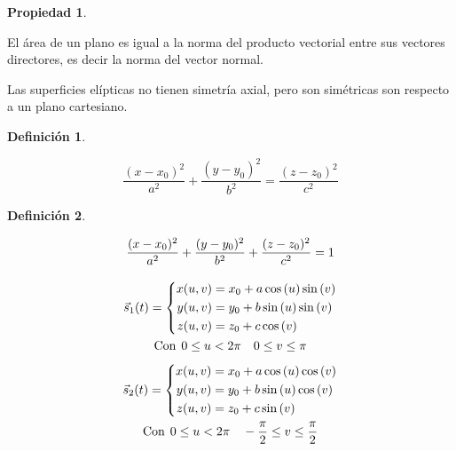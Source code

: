 \documentclass[a5paper,12pt,twoside]{book}
\newtheorem{defn}{{Definición}}[chapter]
\newtheorem{prop}{{Propiedad}}[chapter]
\begin{document}
\begin{mdframed}[style=MyFrame1]
    \begin{prop}
    \end{prop}
    El área de un plano es igual a la norma del producto vectorial entre sus vectores directores, es decir la norma del vector normal.
\end{mdframed}


Las superficies elípticas no tienen simetría axial, pero son simétricas son respecto a un plano cartesiano.

\begin{mdframed}[style=MyFrame1]
    \begin{defn}
    \end{defn}
    \begin{equation*}
        \frac{(x-x_0)^2}{a^2} + \frac{(y-y_0)^2}{b^2} = \frac{(z-z_0)^2}{c^2}
    \end{equation*}
\end{mdframed}

\begin{mdframed}[style=MyFrame1]
    \begin{defn}
    \end{defn}
    \begin{gather*}
        \frac{(x-x_0)^2}{a^2} + \frac{(y-y_0)^2}{b^2} + \frac{(z-z_0)^2}{c^2} = 1
        \\[1em]
        \Vec{s}_1(t) = \left\{
        \begin{aligned}
            x(u,v) &= x_0 + a \cos{(u)} \sin{(v)} \\
            y(u,v) &= y_0 + b \sin{(u)} \sin{(v)} \\
            z(u,v) &= z_0 + c \cos{(v)}
        \end{aligned}
        \right.
        \\
        \textrm{Con} \hspace{1ex} 0 \leq u < 2 \pi \quad 0 \leq v \leq \pi
        \\[1ex]
        \Vec{s}_2(t) = \left\{
        \begin{aligned}
            x(u,v) &= x_0 + a \cos{(u)} \cos{(v)} \\
            y(u,v) &= y_0 + b \sin{(u)} \cos{(v)} \\
            z(u,v) &= z_0 + c \sin{(v)}
        \end{aligned}
        \right.
        \\
        \textrm{Con} \hspace{1ex} 0 \leq u < 2 \pi \quad -\dfrac{\pi}{2} \leq v \leq \dfrac{\pi}{2}
    \end{gather*}
\end{mdframed}
\end{document}
